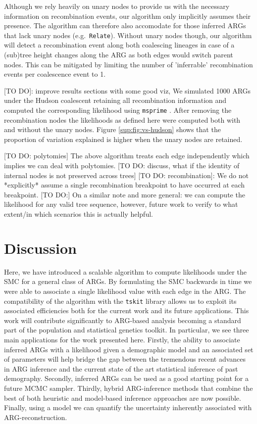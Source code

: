 \documentclass{article}
\newcommand{\relate}[0]{\texttt{Relate}}
\begin{document}
Although we rely heavily on unary nodes to provide us with the necessary 
information on recombination events, our algorithm only implicitly assumes their presence.
The algorithm can therefore also accomodate for 
those inferred ARGs that lack unary nodes (e.g.\ \relate). 
Without unary nodes though, our algorithm will detect a recombination event along 
both coalescing lineages in case of a (sub)tree height changes along the ARG as both 
edges would switch parent nodes. This can be mitigated by limiting the number of 
'inferrable' recombination events per coalescence event to 1.

[TO DO]: improve results sections with some good viz,
We simulated 1000 ARGs under the Hudson coalescent retaining all recombination information 
and computed the corresponding likelihood using \texttt{msprime} \citep{baumdicker_efficient_2021}. 
After removing the recombination nodes the likelihoods as defined here were computed both with and 
without the unary nodes. Figure \ref{sup:fig:vs-hudson} shows that the proportion of variation 
explained is higher when the unary nodes are retained.

[TO DO: polytomies] The above algorithm treats each edge independently which implies 
we can deal with polytomies.
[TO DO: discuss, what if the identity of internal nodes is not preserved across trees]
[TO DO: recombination]: We do not *explicitly* assume a single recombination breakpoint to have 
occurred at each breakpoint.
[TO DO:] On a similar note and more general: we can compute the likelihood for any 
valid tree sequence, however, future work to verify to what extent/in which scenarios 
this is actually helpful.
 
\section{Discussion}

Here, we have introduced a scalable algorithm to compute likelihoods 
under the SMC for a general class of ARGs. By formulating the SMC backwards in time 
we were able to associate a single likelihood value with each edge in the ARG. 
The compatibility of the algorithm with the \texttt{tskit} library allows us to 
exploit its associated efficiencies both for the current work and its future 
applications. This work will contribute significantly 
to ARG-based analysis becoming a standard part of the population 
and statistical genetics toolkit. 
In particular, we see three main applications for the work presented here. 
Firstly, the ability to associate inferred ARGs with a likelihood given a demographic 
model and an associated set of parameters will help bridge the gap between the tremendous recent 
advances in ARG inference and the current state of the art statistical inference of 
past demography. 
Secondly, inferred ARGs can be used as a good starting point for a future MCMC sampler.
Thirdly, hybrid ARG-inference methods that combine the best of both 
heuristic and model-based inference approaches are now possible.
Finally, using a model we can quantify the uncertainty inherently associated 
with ARG-reconstruction.
\end{document}
